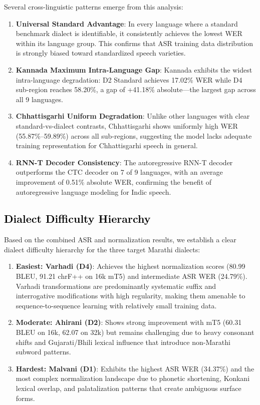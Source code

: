 Several cross-linguistic patterns emerge from this analysis:

\begin{enumerate}
    \item \textbf{Universal Standard Advantage}: In every language where a standard benchmark dialect is identifiable, it consistently achieves the lowest WER within its language group. This confirms that ASR training data distribution is strongly biased toward standardized speech varieties.
    \item \textbf{Kannada Maximum Intra-Language Gap}: Kannada exhibits the widest intra-language degradation: D2 Standard achieves 17.02\% WER while D4 sub-region reaches 58.20\%, a gap of +41.18\% absolute---the largest gap across all 9 languages.
    \item \textbf{Chhattisgarhi Uniform Degradation}: Unlike other languages with clear standard-vs-dialect contrasts, Chhattisgarhi shows uniformly high WER (55.87\%--59.89\%) across all sub-regions, suggesting the model lacks adequate training representation for Chhattisgarhi speech in general.
    \item \textbf{RNN-T Decoder Consistency}: The autoregressive RNN-T decoder outperforms the CTC decoder on 7 of 9 languages, with an average improvement of 0.51\% absolute WER, confirming the benefit of autoregressive language modeling for Indic speech.
\end{enumerate}

\subsection{\textcolor{black}{Dialect Difficulty Hierarchy}}

Based on the combined ASR and normalization results, we establish a clear dialect difficulty hierarchy for the three target Marathi dialects:

\begin{enumerate}
    \item \textbf{Easiest: Varhadi (D4)}: Achieves the highest normalization scores (80.99 BLEU, 91.21 chrF++ on 16k mT5) and intermediate ASR WER (24.79\%). Varhadi transformations are predominantly systematic suffix and interrogative modifications with high regularity, making them amenable to sequence-to-sequence learning with relatively small training data.
    \item \textbf{Moderate: Ahirani (D2)}: Shows strong improvement with mT5 (60.31 BLEU on 16k, 62.07 on 32k) but remains challenging due to heavy consonant shifts and Gujarati/Bhili lexical influence that introduce non-Marathi subword patterns.
    \item \textbf{Hardest: Malvani (D1)}: Exhibits the highest ASR WER (34.37\%) and the most complex normalization landscape due to phonetic shortening, Konkani lexical overlap, and palatalization patterns that create ambiguous surface forms.
\end{enumerate}

